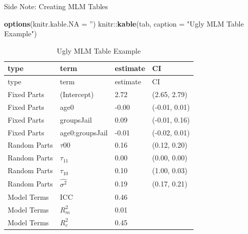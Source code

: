 \documentclass[ignorenonframetext,]{beamer}
\newenvironment{Shaded}{\begin{snugshade}}{\end{snugshade}}
\newcommand{\KeywordTok}[1]{\textcolor[rgb]{0.13,0.29,0.53}{\textbf{{#1}}}}
\newcommand{\DataTypeTok}[1]{\textcolor[rgb]{0.13,0.29,0.53}{{#1}}}
\newcommand{\StringTok}[1]{\textcolor[rgb]{0.31,0.60,0.02}{{#1}}}
\newcommand{\NormalTok}[1]{{#1}}
\begin{document}
\begin{frame}[fragile]{Side Note: Creating MLM Tables}

\small

\begin{Shaded}
\begin{Highlighting}[]
\KeywordTok{options}\NormalTok{(}\DataTypeTok{knitr.kable.NA =} \StringTok{''}\NormalTok{)}
\NormalTok{knitr::}\KeywordTok{kable}\NormalTok{(tab, }\DataTypeTok{caption =} \StringTok{"Ugly MLM Table Example"}\NormalTok{)}
\end{Highlighting}
\end{Shaded}

\begin{longtable}[]{@{}llll@{}}
\caption{Ugly MLM Table Example}\tabularnewline
\toprule
type & term & estimate & CI\tabularnewline
\midrule
\endfirsthead
\toprule
type & term & estimate & CI\tabularnewline
\midrule
\endhead
Fixed Parts & (Intercept) & 2.72 & (2.65, 2.79)\tabularnewline
Fixed Parts & age0 & -0.00 & (-0.01, 0.01)\tabularnewline
Fixed Parts & groupsJail & 0.09 & (-0.01, 0.16)\tabularnewline
Fixed Parts & age0:groupsJail & -0.01 & (-0.02, 0.01)\tabularnewline
Random Parts & \(\tau{00}\) & 0.16 & (0.12, 0.20)\tabularnewline
Random Parts & \(\tau_{11}\) & 0.00 & (0.00, 0.00)\tabularnewline
Random Parts & \(\tau_{10}\) & 0.10 & (1.00, 0.03)\tabularnewline
Random Parts & \(\hat{\sigma^2}\) & 0.19 & (0.17, 0.21)\tabularnewline
Model Terms & ICC & 0.46 &\tabularnewline
Model Terms & \(R^2_m\) & 0.01 &\tabularnewline
Model Terms & \(R^2_c\) & 0.45 &\tabularnewline
\bottomrule
\end{longtable}

\end{frame}
\end{document}
